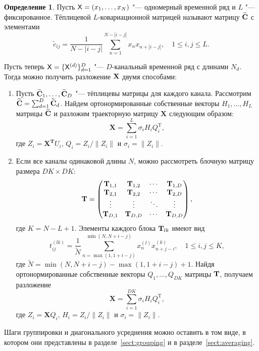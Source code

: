 \documentclass[specialist,
substylefile = spbu_report.rtx,
subf,href,colorlinks=true, 12pt]{disser}
\newcommand{\traj}{\mathbf{X}}
\theoremstyle{definition}
\newtheorem{definition}{Определение}
\begin{document}
	\begin{definition}
	Пусть $\mathsf{X}=(x_1,\ldots,x_N)$ "--- одномерный временной ряд и $L$ "--- фиксированное. Тёплицевой $L$-ковариационной матрицей называют матрицу $\widetilde{\mathbf{C}}$ с элементами
	\[
	\widetilde{c}_{ij}=\frac{1}{N-|i-j|}\sum_{n=1}^{N-|i-j|} x_nx_{n+|i-j|},\quad 1\leqslant i,j \leqslant L.
	\]
	\end{definition}
	
	Пусть теперь $\mathsf{X}=\{\mathsf{X}^{(d)}\}_{d=1}^D$ "--- $D$-канальный временной ряд с длинами $N_d$. Тогда можно получить разложение $\mathbf{X}$ двумя способами:
	\begin{enumerate}
		\item Пусть $\widetilde{\mathbf{C}}_1,\ldots,\widetilde{\mathbf{C}}_D$ "--- тёплицевы матрицы для каждого канала. Рассмотрим $\widetilde{\mathbf{C}}=\sum_{d=1}^D \widetilde{\mathbf{C}}_d$. Найдем ортонормированные собственные векторы $H_1,\ldots,H_L$ матрицы $\widetilde{\mathbf{C}}$ и разложим траекторную матрицу $\traj$ следующим образом:
		\begin{equation}\label{eq:sum_decomposition}
			\mathbf{X}=\sum_{i=1}^L \sigma_i H_i Q_i^\mathrm{T},
		\end{equation}
		где $Z_i=\mathbf{X^T}U_i$, $Q_i=Z_i/\|Z_i\|$ и $\sigma_i=\|Z_i\|$.
		\item Если все каналы одинаковой длины $N$, можно рассмотреть блочную матрицу размера $DK\times DK$:
		\[
		\mathbf{T}=\begin{pmatrix}
			\mathbf{T}_{1,1} & \mathbf{T}_{1,2} & \cdots & \mathbf{T}_{1,D} \\
			\mathbf{T}_{2,1} & \mathbf{T}_{2,2} & \cdots & \mathbf{T}_{2,D} \\
			\vdots  & \vdots  & \ddots & \vdots  \\
			\mathbf{T}_{D,1} & \mathbf{T}_{D,D} & \cdots & \mathbf{T}_{D,D}
		\end{pmatrix},
		\]
		где $K=N-L+1$.
		Элементы каждого блока $\mathbf{T}_{lk}$ имеют вид
		\[
		t^{(lk)}_{ij}=\frac{1}{\tilde N}\sum_{n=\max(1,1+i-j)}^{\min(N,N+i-j)} x^{(l)}_nx^{(k)}_{n+j-i},\quad 1\leqslant i,j\leqslant K,
		\]
		где $\tilde N=\min(N,N+i-j)-\max(1,1+i-j)+1$. Найдя ортонормированные собственные векторы $Q_1,\ldots,Q_{DK}$ матрицы $\mathbf{T}$, получаем разложение
		\begin{equation}\label{eq:block_decomposition}
			\mathbf{X}=\sum_{i=1}^{DK} \sigma_i H_i Q_i^\mathrm{T},    
		\end{equation}
		где $Z_i=\mathbf{X}Q_i$, $H_i=Z_i/\|Z_i\|$ и $\sigma_i=\|Z_i\|$.
	\end{enumerate}
	Шаги группировки и диагонального усреднения можно оставить в том виде, в котором они представлены в разделе~\ref{sect:grouping} и в разделе~\ref{sect:averaging}.
	
\end{document}
